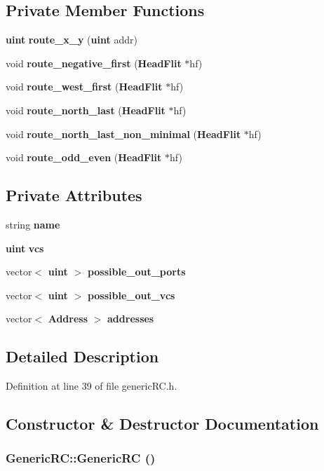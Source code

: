 \subsection*{Private Member Functions}
\begin{CompactItemize}
\item 
{\bf uint} {\bf route\_\-x\_\-y} ({\bf uint} addr)
\item 
void {\bf route\_\-negative\_\-first} ({\bf HeadFlit} $\ast$hf)
\item 
void {\bf route\_\-west\_\-first} ({\bf HeadFlit} $\ast$hf)
\item 
void {\bf route\_\-north\_\-last} ({\bf HeadFlit} $\ast$hf)
\item 
void {\bf route\_\-north\_\-last\_\-non\_\-minimal} ({\bf HeadFlit} $\ast$hf)
\item 
void {\bf route\_\-odd\_\-even} ({\bf HeadFlit} $\ast$hf)
\end{CompactItemize}
\subsection*{Private Attributes}
\begin{CompactItemize}
\item 
string {\bf name}
\item 
{\bf uint} {\bf vcs}
\item 
vector$<$ {\bf uint} $>$ {\bf possible\_\-out\_\-ports}
\item 
vector$<$ {\bf uint} $>$ {\bf possible\_\-out\_\-vcs}
\item 
vector$<$ {\bf Address} $>$ {\bf addresses}
\end{CompactItemize}


\subsection{Detailed Description}


Definition at line 39 of file genericRC.h.

\subsection{Constructor \& Destructor Documentation}
\subsubsection[{GenericRC}]{\setlength{\rightskip}{0pt plus 5cm}GenericRC::GenericRC ()}\label{classGenericRC_92f9cd6b1dafc9eb0a3a1450448888fe}




